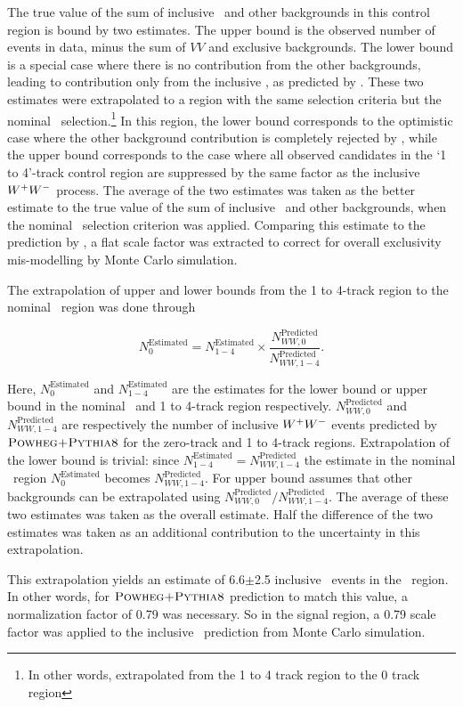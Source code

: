 \par The true value of the sum of inclusive \WW\ and other backgrounds in this control region     
is bound by two estimates. The upper bound is the observed number of events in data, minus the 
sum of $VV$ and exclusive backgrounds. The lower bound is a special case where there is no 
contribution from the other backgrounds, leading to contribution only from the inclusive \WW, as 
predicted by \PowhegPythiaEight. These two estimates were extrapolated to a region with the same selection criteria but the 
nominal \DZ\ selection.\footnote{In other words, extrapolated from the 1 to 4 track region to the 0 track region}
In this region, the lower bound corresponds to the optimistic case where the other background 
contribution is completely rejected by \DZ, while the upper 
bound corresponds to the case where all observed candidates in the `1 to 4'-track control region are suppressed 
by the same factor as the inclusive $W^+W^-$ process. The average of the two estimates was taken as the 
better estimate to the true value of the sum of inclusive \WW\ and other backgrounds, when the nominal 
\DZ\ selection criterion was applied. Comparing this estimate to the prediction by \PowhegPythiaEight, 
a flat scale factor was extracted to correct for overall exclusivity mis-modelling by Monte Carlo 
simulation. 

\par The extrapolation of upper and lower bounds from the 1 to 4-track region to the nominal \DZ\ region 
was done through 

\begin{equation}
N^{\textrm{Estimated}}_{0} = N^{\textrm{Estimated}}_{1-4} 
                       \times \frac{N_{WW,0}^{\textrm{Predicted}}}{N_{WW,1-4}^{\textrm{Predicted}}}.
\end{equation} 

Here, $N^{\textrm{Estimated}}_{0}$ and $N^{\textrm{Estimated}}_{1-4}$ 
are the estimates for the lower bound or upper bound in the nominal \DZ\ and 1 to 4-track 
region respectively. $N_{WW,0}^{\textrm{Predicted}}$ 
and $N_{WW,1-4}^{\textrm{Predicted}}$ are respectively the number of inclusive $W^+W^-$ events predicted 
by $\textsc{Powheg+Pythia8}$ for the zero-track and 1 to 4-track regions. 
Extrapolation of the lower bound is trivial: since $N^{\textrm{Estimated}}_{1-4}=N_{WW,1-4}^{\textrm{Predicted}}$ 
the estimate in the nominal \DZ\ region $N^{\textrm{Estimated}}_{0}$ becomes $N_{WW,1-4}^{\textrm{Predicted}}$. 
For upper bound assumes that other backgrounds can be extrapolated using  
$N_{WW,0}^{\textrm{Predicted}}/N_{WW,1-4}^{\textrm{Predicted}}$. The average of 
these two estimates was taken as the overall estimate. Half the difference of the two estimates was taken 
as an additional contribution to the uncertainty in this extrapolation. 

\par This extrapolation yields an estimate of 6.6$\pm$2.5 inclusive \WW\ events in the \DZ\ region. In other 
words, for $\textsc{Powheg+Pythia8}$ prediction to match this value, a normalization factor of 0.79 was necessary. 
So in the signal region, a 0.79 scale factor was applied to the inclusive \WW\ prediction from Monte Carlo 
simulation. 
 
